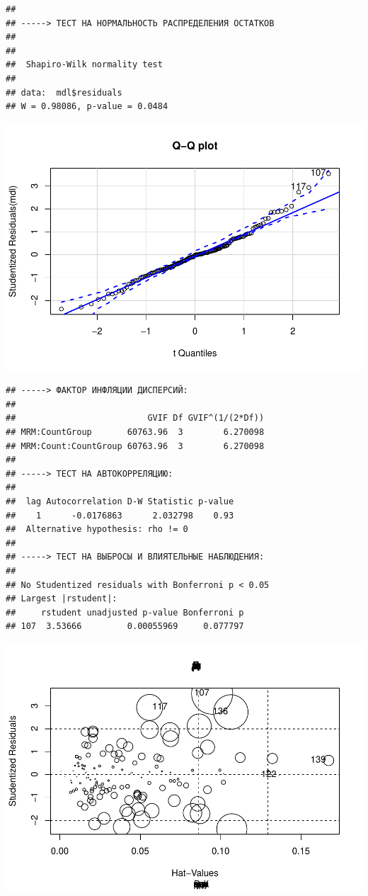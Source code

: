 \documentclass[
]{article}
\begin{document}
\begin{verbatim}
## 
## -----> ТЕСТ НА НОРМАЛЬНОСТЬ РАСПРЕДЕЛЕНИЯ ОСТАТКОВ
## 
## 
##  Shapiro-Wilk normality test
## 
## data:  mdl$residuals
## W = 0.98086, p-value = 0.0484
\end{verbatim}

\begin{center}\includegraphics{Regression-model-for-estimating-RM_files/figure-latex/unnamed-chunk-33-5} \end{center}

\begin{verbatim}
## -----> ФАКТОР ИНФЛЯЦИИ ДИСПЕРСИЙ:
## 
##                          GVIF Df GVIF^(1/(2*Df))
## MRM:CountGroup       60763.96  3        6.270098
## MRM:Count:CountGroup 60763.96  3        6.270098
## 
## -----> ТЕСТ НА АВТОКОРРЕЛЯЦИЮ:
## 
##  lag Autocorrelation D-W Statistic p-value
##    1      -0.0176863      2.032798    0.93
##  Alternative hypothesis: rho != 0
## 
## -----> ТЕСТ НА ВЫБРОСЫ И ВЛИЯТЕЛЬНЫЕ НАБЛЮДЕНИЯ:
## 
## No Studentized residuals with Bonferroni p < 0.05
## Largest |rstudent|:
##     rstudent unadjusted p-value Bonferroni p
## 107  3.53666         0.00055969     0.077797
\end{verbatim}

\begin{center}\includegraphics{Regression-model-for-estimating-RM_files/figure-latex/unnamed-chunk-33-6} \end{center}
\end{document}
